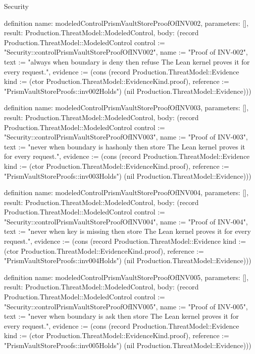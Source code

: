 \begin{lexlean}{Security}
\begin{semanticmodule}
definition{
  name: modeledControlPrismVaultStoreProofOfINV002,
  parameters: [],
  result: Production.ThreatModel::ModeledControl,
  body: (record Production.ThreatModel::ModeledControl {control := "Security::controlPrismVaultStoreProofOfINV002", name := "Proof of INV-002", text := "always when boundary is deny then refuse The Lean kernel proves it for every request.", evidence := (cons (record Production.ThreatModel::Evidence {kind := (ctor Production.ThreatModel::EvidenceKind.proof), reference := "PrismVaultStoreProofs::inv002Holds"}) (nil Production.ThreatModel::Evidence))})
}

definition{
  name: modeledControlPrismVaultStoreProofOfINV003,
  parameters: [],
  result: Production.ThreatModel::ModeledControl,
  body: (record Production.ThreatModel::ModeledControl {control := "Security::controlPrismVaultStoreProofOfINV003", name := "Proof of INV-003", text := "never when boundary is hashonly then store The Lean kernel proves it for every request.", evidence := (cons (record Production.ThreatModel::Evidence {kind := (ctor Production.ThreatModel::EvidenceKind.proof), reference := "PrismVaultStoreProofs::inv003Holds"}) (nil Production.ThreatModel::Evidence))})
}

definition{
  name: modeledControlPrismVaultStoreProofOfINV004,
  parameters: [],
  result: Production.ThreatModel::ModeledControl,
  body: (record Production.ThreatModel::ModeledControl {control := "Security::controlPrismVaultStoreProofOfINV004", name := "Proof of INV-004", text := "never when key is missing then store The Lean kernel proves it for every request.", evidence := (cons (record Production.ThreatModel::Evidence {kind := (ctor Production.ThreatModel::EvidenceKind.proof), reference := "PrismVaultStoreProofs::inv004Holds"}) (nil Production.ThreatModel::Evidence))})
}

definition{
  name: modeledControlPrismVaultStoreProofOfINV005,
  parameters: [],
  result: Production.ThreatModel::ModeledControl,
  body: (record Production.ThreatModel::ModeledControl {control := "Security::controlPrismVaultStoreProofOfINV005", name := "Proof of INV-005", text := "never when boundary is ask then store The Lean kernel proves it for every request.", evidence := (cons (record Production.ThreatModel::Evidence {kind := (ctor Production.ThreatModel::EvidenceKind.proof), reference := "PrismVaultStoreProofs::inv005Holds"}) (nil Production.ThreatModel::Evidence))})
}


\end{semanticmodule}
\end{lexlean}
